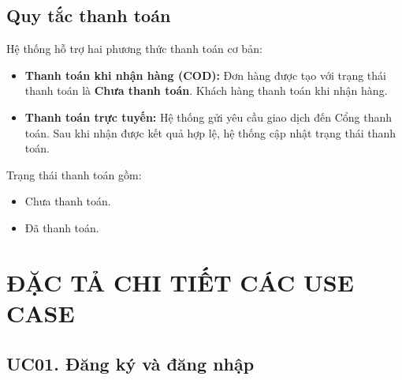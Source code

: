 \documentclass[12pt,a4paper]{article}
\begin{document}
\subsection*{Quy tắc thanh toán}

Hệ thống hỗ trợ hai phương thức thanh toán cơ bản:

\begin{itemize}

    \item \textbf{Thanh toán khi nhận hàng (COD):} Đơn hàng được tạo với trạng thái thanh toán là \textbf{Chưa thanh toán}. Khách hàng thanh toán khi nhận hàng.

    \item \textbf{Thanh toán trực tuyến:} Hệ thống gửi yêu cầu giao dịch đến Cổng thanh toán. Sau khi nhận được kết quả hợp lệ, hệ thống cập nhật trạng thái thanh toán.

\end{itemize}

Trạng thái thanh toán gồm:

\begin{itemize}
    \item Chưa thanh toán.
    \item Đã thanh toán.
\end{itemize}

\section{ĐẶC TẢ CHI TIẾT CÁC USE CASE}

\subsection*{UC01. Đăng ký và đăng nhập}
\end{document}

